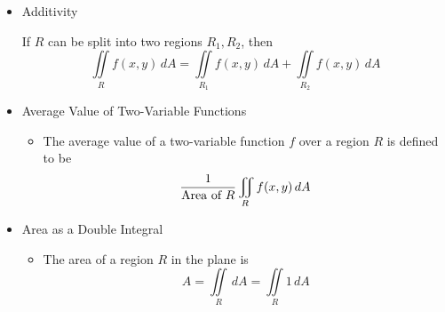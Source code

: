 \begin{itemize}
      
    \item Additivity
    
    If $R$ can be split into two regions $R_1,R_2$, then
      \[\iint\limits_R f(x,y)\,dA = \iint\limits_{R_1} f(x,y)\,dA + \iint\limits_{R_2} f(x,y)\,dA\]

  \item Average Value of Two-Variable Functions
    \begin{itemize}
      \item The average value of a two-variable function $f$ over a region $R$ is defined to be
        \[
          \frac{1}{\text{Area of }R}\iint_R f(x,y)\,d{A}
        \]
    \end{itemize}

  \item Area as a Double Integral
    
    \begin{itemize}
    \item The area of a region $R$ in the plane is \[A = \iint\limits_R\,dA=\iint\limits_R 1\,dA\]
    \end{itemize}
    
  
    
  \end{itemize}
  
